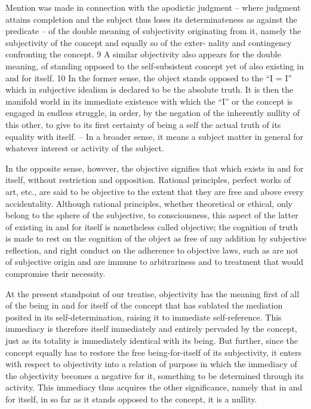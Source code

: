 Mention was made in connection with the apodictic judgment – where
judgment attains completion and the subject thus loses its determinateness
as against the predicate – of the double meaning of subjectivity originating
from it, namely the subjectivity of the concept and equally so of the exter-
nality and contingency confronting the concept. 9 A similar objectivity also
appears for the double meaning, of standing opposed to the self-subsistent
concept yet of also existing in and for itself. 10 In the former sense, the object
stands opposed to the “I = I” which in subjective idealism is declared to be
the absolute truth. It is then the manifold world in its immediate existence
with which the “I” or the concept is engaged in endless struggle, in order,
by the negation of the inherently nullity of this other, to give to its first
certainty of being a self the actual truth of its equality with itself. – In a
broader sense, it means a subject matter in general for whatever interest or
activity of the subject.

In the opposite sense, however, the objective signifies
that which exists in and for itself,
without restriction and opposition.
Rational principles, perfect works of art, etc.,
are said to be objective to the extent
that they are free and above every accidentality.
Although rational principles, whether theoretical or ethical,
only belong to the sphere of the subjective, to consciousness,
this aspect of the latter of existing in and for itself
is nonetheless called objective;
the cognition of truth is made to rest on the cognition of
the object as free of any addition by subjective reflection, and right conduct
on the adherence to objective laws, such as are not of subjective origin and
are immune to arbitrariness and to treatment that would compromise their
necessity.

At the present standpoint of our treatise,
objectivity has the meaning first of all of
the being in and for itself of the concept
that has sublated the mediation posited
in its self-determination,
raising it to immediate self-reference.
This immediacy is therefore itself immediately
and entirely pervaded by the concept,
just as its totality is immediately identical with its being.
But further, since the concept equally has to restore the free
being-for-itself of its subjectivity,
it enters with respect to objectivity
into a relation of purpose
in which the immediacy of the objectivity
becomes a negative for it,
something to be determined through its activity.
This immediacy thus acquires the other significance,
namely that in and for itself, in so far as it
stands opposed to the concept, it is a nullity.

